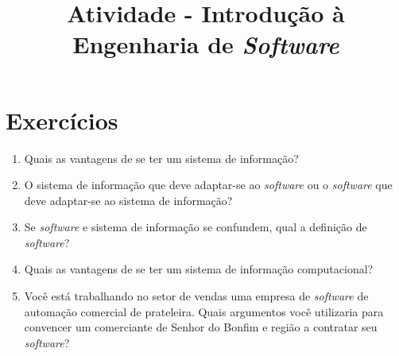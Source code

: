 \documentclass[12pt,a4paper]{article}
\title{Atividade - Introdução à Engenharia de \textit{Software}}
\author{}
\date{}
\begin{document}
   \maketitle
   \section*{Exercícios}
      \begin{enumerate}
         \item Quais as vantagens de se ter um sistema de informação?
         \item O sistema de informação que deve adaptar-se ao \textit{software} ou o \textit{software} que deve adaptar-se ao sistema de informação?
         \item Se \textit{software} e sistema de informação se confundem, qual a definição de \textit{software}?
         \item Quais as vantagens de se ter um sistema de informação computacional?
         \item Você está trabalhando no setor de vendas uma empresa de \textit{software} de automação comercial de prateleira. Quais argumentos você utilizaria para convencer um comerciante de Senhor do Bonfim e região a contratar seu \textit{software}?
      \end{enumerate}
      
\end{document}

